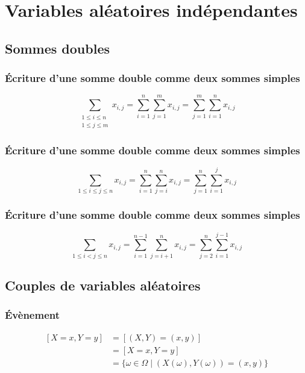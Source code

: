 \section{Variables aléatoires indépendantes}
    \subsection{Sommes doubles}

        \subsubsection{Écriture d'une somme double comme deux sommes simples}
            \begin{equation*}
                \sum_{\substack{1 \le i \le n \\ 1 \le j \le m}} x_{i, j} = \sum_{i=1}^{n}\sum_{j=1}^{m} x_{i, j} = \sum_{j=1}^{m}\sum_{i=1}^{n} x_{i, j}
            \end{equation*}

        \subsubsection{Écriture d'une somme double comme deux sommes simples}
            \begin{equation*}
                \sum_{1 \le i \le j \le n} x_{i, j} = \sum_{i=1}^{n}\sum_{j=i}^{n} x_{i, j} = \sum_{j=1}^{n}\sum_{i=1}^{j} x_{i, j}
            \end{equation*}

        \subsubsection{Écriture d'une somme double comme deux sommes simples}
            \begin{equation*}
                \sum_{1 \le i < j \le n} x_{i, j} = \sum_{i=1}^{n-1}\sum_{j=i+1}^{n} x_{i, j} = \sum_{j=2}^{n}\sum_{i=1}^{j-1} x_{i, j}
            \end{equation*}

    \subsection{Couples de variables aléatoires}
        \subsubsection{Évènement}
            \begin{equation*}
                \begin{split}
                    [X = x, Y = y] &= [(X, Y) = (x, y)]\\
                    &= [X = x, Y = y]\\
                    &= \{\omega \in \Omega \mid (X(\omega), Y(\omega)) = (x, y)\}
                \end{split}
            \end{equation*}

